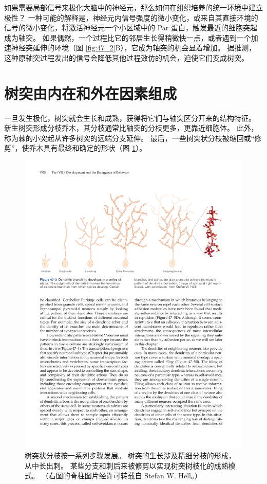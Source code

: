 如果需要局部信号来极化大脑中的神经元，那么如何在组织培养的统一环境中建立极性？ 一种可能的解释是，神经元内信号强度的微小变化，或来自其直接环境的信号的微小变化，将激活神经元一个小区域中的 Par 蛋白，触发最近的细胞突起成为轴突。 如果偶然，一个过程比它的邻居生长得稍微快一点，或者遇到一个加速神经突延伸的环境（图 \ref{fig:47_2}B），它成为轴突的机会显着增加。 据推测，这种原轴突过程发出的信号会降低其他过程效仿的机会，迫使它们变成树突。

\section{树突由内在和外在因素组成}
一旦发生极化，树突就会生长和成熟，获得将它们与轴突区分开来的结构特征。 新生树突形成分枝乔木，其分枝通常比轴突的分枝更多，更靠近细胞体。 此外，称为棘的小突起从许多树突的远端分支延伸。 
最后，一些树突状分枝被缩回或“修剪”，使乔木具有最终和确定的形状（图 \ref{fig:47_3}）。

\begin{figure}[htbp]
	\centering
	\includegraphics[width=0.95\linewidth]{chap47/fig_47_3}
	\caption{树突状分枝按一系列步骤发展。 树突的生长涉及精细分枝的形成，从中长出刺。 某些分支和刺后来被修剪以实现树突树枝化的成熟模式。 （右图的脊柱图片经许可转载自 Stefan W. Hell。）}
	\label{fig:47_3}
\end{figure}

